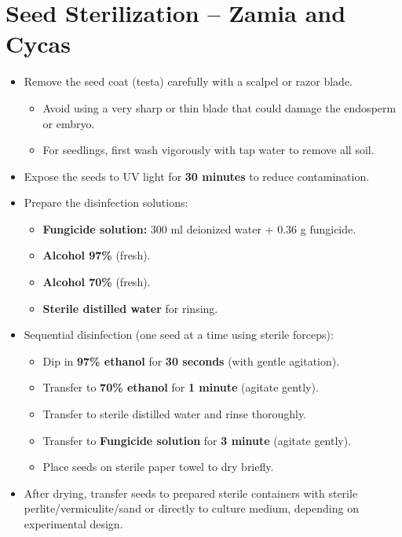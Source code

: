 \documentclass[
  11pt,
]{article}
\providecommand{\tightlist}{%
  \setlength{\itemsep}{0pt}\setlength{\parskip}{0pt}}
\begin{document}
\section{Seed Sterilization -- Zamia and
Cycas}\label{seed-sterilization-zamia-and-cycas}

\begin{itemize}
\item
  Remove the seed coat (testa) carefully with a scalpel or razor blade.

  \begin{itemize}
  \tightlist
  \item
    Avoid using a very sharp or thin blade that could damage the
    endosperm or embryo.\\
  \item
    For seedlings, first wash vigorously with tap water to remove all
    soil.
  \end{itemize}
\item
  Expose the seeds to UV light for \textbf{30 minutes} to reduce
  contamination.
\item
  Prepare the disinfection solutions:

  \begin{itemize}
  \tightlist
  \item
    \textbf{Fungicide solution:} 300 ml deionized water + 0.36 g
    fungicide.\\
  \item
    \textbf{Alcohol 97\%} (fresh).\\
  \item
    \textbf{Alcohol 70\%} (fresh).\\
  \item
    \textbf{Sterile distilled water} for rinsing.
  \end{itemize}
\item
  Sequential disinfection (one seed at a time using sterile forceps):

  \begin{itemize}
  \tightlist
  \item
    Dip in \textbf{97\% ethanol} for \textbf{30 seconds} (with gentle
    agitation).\\
  \item
    Transfer to \textbf{70\% ethanol} for \textbf{1 minute} (agitate
    gently).
  \item
    Transfer to sterile distilled water and rinse thoroughly.\\
  \item
    Transfer to \textbf{Fungicide solution} for \textbf{3 minute}
    (agitate gently).\\
  \item
    Place seeds on sterile paper towel to dry briefly.
  \end{itemize}
\item
  After drying, transfer seeds to prepared sterile containers with
  sterile perlite/vermiculite/sand or directly to culture medium,
  depending on experimental design.
\end{itemize}
\end{document}
